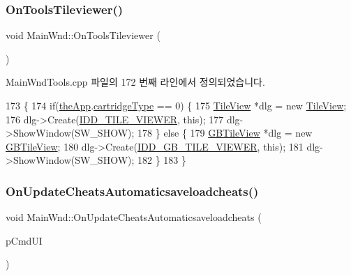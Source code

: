 \subsubsection{\texorpdfstring{On\+Tools\+Tileviewer()}{OnToolsTileviewer()}}
{\footnotesize\ttfamily void Main\+Wnd\+::\+On\+Tools\+Tileviewer (\begin{DoxyParamCaption}{ }\end{DoxyParamCaption})\hspace{0.3cm}{\ttfamily [protected]}}



Main\+Wnd\+Tools.\+cpp 파일의 172 번째 라인에서 정의되었습니다.


\begin{DoxyCode}
173 \{
174   \textcolor{keywordflow}{if}(\mbox{\hyperlink{_v_b_a_8cpp_a8095a9d06b37a7efe3723f3218ad8fb3}{theApp}}.\mbox{\hyperlink{class_v_b_a_af300759fcbc7eeb00ce73f956fc5ddb7}{cartridgeType}} == 0) \{
175     \mbox{\hyperlink{class_tile_view}{TileView}} *dlg = \textcolor{keyword}{new} \mbox{\hyperlink{class_tile_view}{TileView}};
176     dlg->Create(\mbox{\hyperlink{resource_8h_a375920ad1073742c5301fffbbed0e205}{IDD\_TILE\_VIEWER}}, \textcolor{keyword}{this});
177     dlg->ShowWindow(SW\_SHOW);
178   \} \textcolor{keywordflow}{else} \{
179     \mbox{\hyperlink{class_g_b_tile_view}{GBTileView}} *dlg = \textcolor{keyword}{new} \mbox{\hyperlink{class_g_b_tile_view}{GBTileView}};
180     dlg->Create(\mbox{\hyperlink{resource_8h_a28c41ac1212f846fd89d9d038a701c30}{IDD\_GB\_TILE\_VIEWER}}, \textcolor{keyword}{this});
181     dlg->ShowWindow(SW\_SHOW);
182   \}
183 \}
\end{DoxyCode}
\mbox{\label{class_main_wnd_afa1543743f747c2a7de5f4b7a60be05b}} 
\subsubsection{\texorpdfstring{On\+Update\+Cheats\+Automaticsaveloadcheats()}{OnUpdateCheatsAutomaticsaveloadcheats()}}
{\footnotesize\ttfamily void Main\+Wnd\+::\+On\+Update\+Cheats\+Automaticsaveloadcheats (\begin{DoxyParamCaption}\item[{C\+Cmd\+UI $\ast$}]{p\+Cmd\+UI }\end{DoxyParamCaption})\hspace{0.3cm}{\ttfamily [protected]}}



